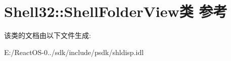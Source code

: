\hypertarget{class_shell32_1_1_shell_folder_view}{}\section{Shell32\+:\+:Shell\+Folder\+View类 参考}
\label{class_shell32_1_1_shell_folder_view}


该类的文档由以下文件生成\+:\begin{DoxyCompactItemize}
\item 
E\+:/\+React\+O\+S-\/0../sdk/include/psdk/shldisp.\+idl\end{DoxyCompactItemize}

